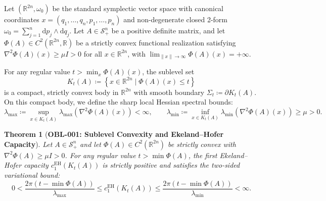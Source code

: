 \documentclass[11pt,a4paper,reqno]{amsart}
\newtheorem{theorem}{Theorem}[section]
\theoremstyle{definition}
\theoremstyle{remark}
\numberwithin{equation}{section}
\newcommand{\dif}{\mathrm{d}}
\begin{document}
Let $(\mathbb{R}^{2n}, \omega_0)$ be the standard symplectic vector space with canonical coordinates $x = (q_1, \dots, q_n, p_1, \dots, p_n)$ and non-degenerate closed 2-form $\omega_0 = \sum_{j=1}^n \dif p_j \wedge \dif q_j$. 
Let $A \in \mathcal{S}_+^n$ be a positive definite matrix, and let $\Phi(A) \in C^2(\mathbb{R}^{2n}, \mathbb{R})$ be a strictly convex functional realization satisfying $\nabla^2 \Phi(A)(x) \ge \mu I > 0$ for all $x \in \mathbb{R}^{2n}$, with $\lim_{\|x\| \to \infty} \Phi(A)(x) = +\infty$.

For any regular value $t > \min_{x} \Phi(A)(x)$, the sublevel set
\begin{equation}
K_t(A) \coloneqq \left\{ x \in \mathbb{R}^{2n} \mid \Phi(A)(x) \le t \right\}
\end{equation}
is a compact, strictly convex body in $\mathbb{R}^{2n}$ with smooth boundary $\Sigma_t \coloneqq \partial K_t(A)$. On this compact body, we define the sharp local Hessian spectral bounds:
\begin{equation}
\lambda_{\max} \coloneqq \sup_{x \in K_t(A)} \lambda_{\max}\left(\nabla^2 \Phi(A)(x)\right) < \infty, \qquad \lambda_{\min} \coloneqq \inf_{x \in K_t(A)} \lambda_{\min}\left(\nabla^2 \Phi(A)(x)\right) \ge \mu > 0.
\end{equation}

\begin{theorem}[\textbf{OBL-001: Sublevel Convexity and Ekeland--Hofer Capacity}]
\label{thm:eh_capacity_pos}
Let $A \in \mathcal{S}_+^n$ and let $\Phi(A) \in C^2(\mathbb{R}^{2n})$ be strictly convex with $\nabla^2 \Phi(A) \ge \mu I > 0$. For any regular value $t > \min \Phi(A)$, the first Ekeland--Hofer capacity $c_1^{\mathrm{EH}}(K_t(A))$ is strictly positive and satisfies the two-sided variational bound:
\begin{equation}
\label{eq:eh_bound}
0 < \frac{2\pi (t - \min \Phi(A))}{\lambda_{\max}} \le c_1^{\mathrm{EH}}(K_t(A)) \le \frac{2\pi (t - \min \Phi(A))}{\lambda_{\min}} < \infty.
\end{equation}
\end{theorem}
\end{document}
